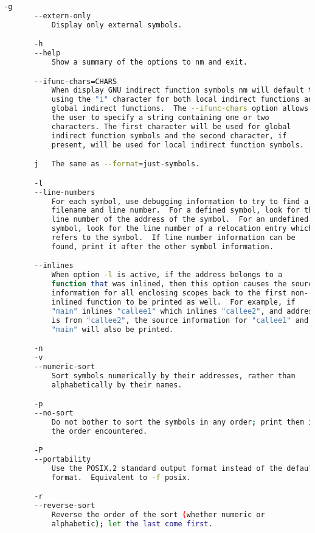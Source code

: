 {{\begin{lstlisting}[language=bash]
       -g
       --extern-only
           Display only external symbols.

       -h
       --help
           Show a summary of the options to nm and exit.

       --ifunc-chars=CHARS
           When display GNU indirect function symbols nm will default to
           using the "i" character for both local indirect functions and
           global indirect functions.  The --ifunc-chars option allows
           the user to specify a string containing one or two
           characters. The first character will be used for global
           indirect function symbols and the second character, if
           present, will be used for local indirect function symbols.

       j   The same as --format=just-symbols.

       -l
       --line-numbers
           For each symbol, use debugging information to try to find a
           filename and line number.  For a defined symbol, look for the
           line number of the address of the symbol.  For an undefined
           symbol, look for the line number of a relocation entry which
           refers to the symbol.  If line number information can be
           found, print it after the other symbol information.

       --inlines
           When option -l is active, if the address belongs to a
           function that was inlined, then this option causes the source
           information for all enclosing scopes back to the first non-
           inlined function to be printed as well.  For example, if
           "main" inlines "callee1" which inlines "callee2", and address
           is from "callee2", the source information for "callee1" and
           "main" will also be printed.

       -n
       -v
       --numeric-sort
           Sort symbols numerically by their addresses, rather than
           alphabetically by their names.

       -p
       --no-sort
           Do not bother to sort the symbols in any order; print them in
           the order encountered.

       -P
       --portability
           Use the POSIX.2 standard output format instead of the default
           format.  Equivalent to -f posix.

       -r
       --reverse-sort
           Reverse the order of the sort (whether numeric or
           alphabetic); let the last come first.


\end{lstlisting}}}

